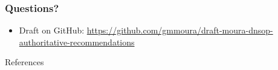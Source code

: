 \documentclass[11pt,show 
notes,notheorems,noamsthm,blank]{beamer} %
\begin{document}
 
\begin{frame}
 \frametitle{Questions?}
 
 
 \begin{itemize}
  \item Draft on GitHub: \small
\url{https://github.com/gmmoura/draft-moura-dnsop-authoritative-recommendations}
 \end{itemize}

\end{frame}


 
 \begin{frame}[allowframebreaks] {References}
 

\small

\end{frame}
 
\end{document}
